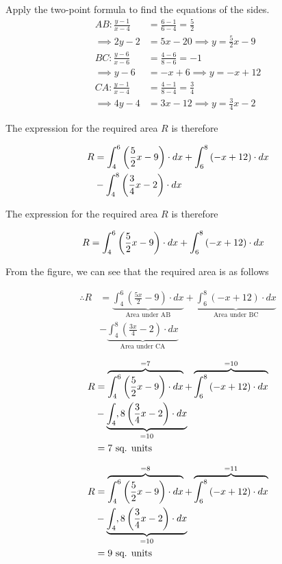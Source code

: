 \documentclass[14pt,fleqn]{extarticle}
\begin{document}
\newcard

Apply the two-point formula to find the 
equations of the sides. 
%
\begin{align}
AB: \frac{y-1}{x-4} &= \frac{6-1}{6-4} = \frac{5}{2} \\
\implies 2y-2 &= 5x-20\implies y = \frac{5}{2}x -9 \\
BC:\frac{y-6}{x-6} &= \frac{4-6}{8-6} = -1 \\ 
\implies y-6 &= -x + 6 \implies y = -x + 12 \\
CA: \frac{y-1}{x-4} &= \frac{4-1}{8-4} = \frac{3}{4} \\
\implies 4y-4 &= 3x-12 \implies y=\frac{3}{4}x -2 
\end{align}
%
\newcard 

The expression for the required area $R$ is therefore 

\begin{align}
	R &= \int_4^6 \left(\frac{5}{2}x - 9 \right)\cdot dx + \int_6^8 \left(-x+12 \right)\cdot dx \\
	&- \int_4^8 \left(\frac{3}{4}x - 2 \right) \cdot dx 
\end{align}

\newcard

The expression for the required area $R$ is therefore 

\begin{align}
	R &= \int_4^6 \left(\frac{5}{2}x - 9 \right)\cdot dx + \int_6^8 \left(-x+12 \right)\cdot dx 
\end{align}


\newcard

From the figure, we can see that the 
required area is as follows 

%
\begin{align}
\therefore R &= \underbrace{\int_4^6\left( \frac{5x}{2}-9\right)\cdot dx}_{\text{Area under AB}} 
+ \underbrace{\int_6^8(-x+12)\cdot dx}_{\text{Area under BC}} \\
&- \underbrace{\int_4^8\left( \frac{3x}{4}-2\right)\cdot dx}_{\text{Area under CA}}
\end{align}

\newcard

\begin{align}
	R &= \overbrace{\int_4^6 \left(\frac{5}{2}x - 9 \right)\cdot dx}^{= 7} + \overbrace{\int_6^8 \left(-x+12 \right)\cdot dx}^{=10} \\
	&- \underbrace{\int_4,8 \left(\frac{3}{4}x - 2 \right)\cdot dx}_{=10} \\
	&= 7\text{ sq. units} 
\end{align}

\newcard 

\begin{align}
	R &= \overbrace{\int_4^6 \left(\frac{5}{2}x - 9 \right)\cdot dx}^{= 8} + \overbrace{\int_6^8 \left(-x+12 \right)\cdot dx}^{=11} \\
	&- \underbrace{\int_4,8 \left(\frac{3}{4}x - 2 \right)\cdot dx}_{=10} \\
	&= 9\text{ sq. units} 
\end{align}
\end{document}
